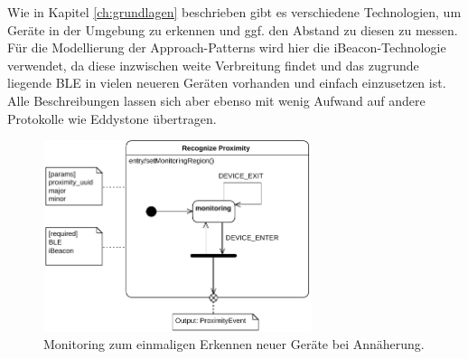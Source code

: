 Wie in Kapitel \ref{ch:grundlagen} beschrieben gibt es verschiedene Technologien, um Geräte in der Umgebung zu erkennen und ggf. den Abstand zu diesen zu messen. Für die Modellierung der Approach-Patterns wird hier die iBeacon-Technologie verwendet, da diese inzwischen weite Verbreitung findet und das zugrunde liegende \acs{BLE} in vielen neueren Geräten vorhanden und einfach einzusetzen ist. Alle Beschreibungen lassen sich aber ebenso mit wenig Aufwand auf andere Protokolle wie \zb Eddystone übertragen.
\begin{figure}[h]
\centering
\includegraphics[page=1,width=0.7\textwidth]{bilder/approach/recognize}
\caption{Monitoring zum einmaligen Erkennen neuer Geräte bei Annäherung.}
\label{fig:approach_monitoring}
\end{figure}

